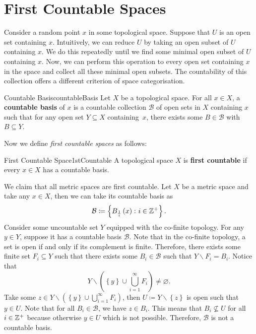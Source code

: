 \documentclass[math]{amznotes}
\theoremstyle{remark}
\begin{document}
\section{First Countable Spaces}
Consider a random point $x$ in some topological space. Suppose that $U$ is an open set containing $x$. Intuitively, we can reduce $U$ by taking an open subset of $U$ containing $x$. We do this repeatedly until we find some minimal open subset of $U$ containing $x$. Now, we can perform this operation to every open set containing $x$ in the space and collect all these minimal open subsets. The countability of this collection offers a different criterion of space categorisation.
\begin{dfnbox}{Countable Basis}{countableBasis}
    Let $X$ be a topological space. For all $x \in X$, a {\color{red} \textbf{countable basis}} of $x$ is a countable collection $\mathcal{B}$ of open sets in $X$ containing $x$ such that for any open set $Y \subseteq X$ containing~$x$, there exists some $B \in \mathcal{B}$ with $B \subseteq Y$. 
\end{dfnbox}
Now we define \textit{first countable spaces} as follows:
\begin{dfnbox}{First Countable Space}{1stCountable}
    A topological space $X$ is {\color{red} \textbf{first countable}} if every $x \in X$ has a countable basis.
\end{dfnbox}
We claim that all metric spaces are first countable. Let $X$ be a metric space and take any $x \in X$, then we can take its countable basis as 
\begin{equation*}
    \mathcal{B} \coloneqq \left\{B_{\frac{1}{i}}\left(x\right) \colon i \in \mathbb{Z}^+\right\}.
\end{equation*}
Consider some uncountable set $Y$ equipped with the co-finite topology. For any $y \in Y$, suppose it has a countable basis $\mathcal{B}$. Note that in the co-finite topology, a set is open if and only if its complement is finite. Therefore, there exists some finite set $F_i \subseteq Y$ such that there exists some $B_i \in \mathcal{B}$ such that $Y \backslash F_i = B_i$. Notice that 
\begin{equation*}
    Y \backslash \left(\left\{y\right\} \cup \bigcup_{i = 1}^{\infty}F_i\right) \neq \varnothing.
\end{equation*}
Take some $z \in Y \backslash \left(\left\{y\right\} \cup \bigcup_{i = 1}^{\infty}F_i\right)$, then $U \coloneqq Y \backslash \left\{z\right\}$ is open such that $y \in U$. Note that for all $B_i \in \mathcal{B}$, we have $z \in B_i$. This means that $B_i \not\subseteq U$ for all $i \in \mathbb{Z}^+$ because otherwise $y \in U$ which is not possible. Therefore, $\mathcal{B}$ is not a countable basis.
\end{document}
